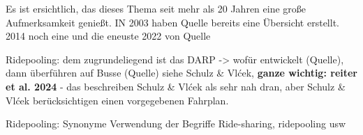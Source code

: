 Es ist ersichtlich, das dieses Thema seit mehr als 20 Jahren eine große Aufmerksamkeit genießt. IN 2003 haben Quelle bereits eine Übersicht erstellt. 2014 noch eine und die eneuste 2022 von Quelle

Ridepooling: dem zugrundeliegend ist das DARP -> wofür entwickelt (Quelle), dann überführen auf Busse (Quelle) siehe Schulz \& Vlćek, \textbf{ganze wichtig: reiter et al. 2024} - das beschreiben Schulz \& Vlćek als sehr nah dran, aber Schulz \& Vlćek berücksichtigen einen vorgegebenen Fahrplan. 

Ridepooling: Synonyme Verwendung der Begriffe Ride-sharing, ridepooling usw

\begin{landscape} 
    \begin{table}[p]
        \centering
        \caption{Forschungsergebnisse zu Line-based — rural}
        \label{tab:lb-rural}
        \scriptsize
        \setlength{\tabcolsep}{2.5pt}
        \setlength{\arrayrulewidth}{0.1pt}

\end{table}
\end{landscape}
